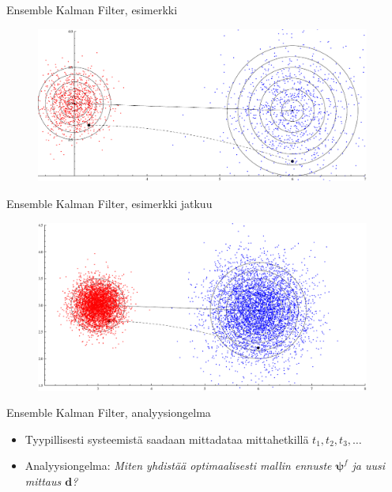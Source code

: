 \documentclass{beamer}
\begin{document}
\begin{frame}{Ensemble Kalman Filter, esimerkki}

\begin{figure}
\includegraphics[width=11cm]{enkf3.pdf}
\end{figure}

\end{frame}

\begin{frame}{Ensemble Kalman Filter, esimerkki jatkuu}

\begin{figure}
\includegraphics[width=11cm]{enkf4.pdf}
\end{figure}

\end{frame}

\begin{frame}{Ensemble Kalman Filter, analyysiongelma}

\begin{itemize}
\item Tyypillisesti systeemistä saadaan mittadataa mittahetkillä $t_1, t_2, t_3, \dots$
\item Analyysiongelma: \emph{Miten yhdistää optimaalisesti mallin ennuste $\boldsymbol{\psi}^f$ ja uusi mittaus $\boldsymbol{d}$?}
\end{itemize}

\end{frame}
\end{document}
